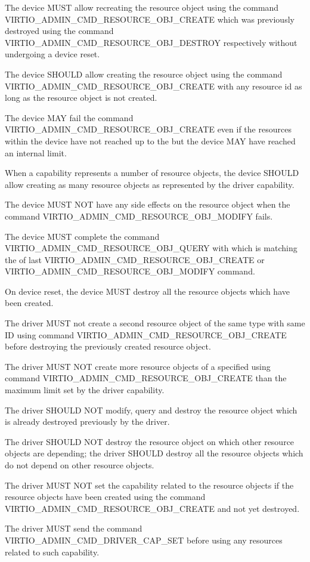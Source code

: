 The device MUST allow recreating the resource object using the command
VIRTIO_ADMIN_CMD_RESOURCE_OBJ_CREATE which was previously
destroyed using the command VIRTIO_ADMIN_CMD_RESOURCE_OBJ_DESTROY respectively
without undergoing a device reset.

The device SHOULD allow creating the resource object using
the command VIRTIO_ADMIN_CMD_RESOURCE_OBJ_CREATE with any resource
id as long as the resource object is not created.

The device MAY fail the command VIRTIO_ADMIN_CMD_RESOURCE_OBJ_CREATE even if the
resources within the device have not reached up to the 
but the device MAY have reached an internal limit.

When a capability represents a number of resource objects, the device SHOULD
allow creating as many resource objects as represented by the driver capability.

The device MUST NOT have any side effects on the resource object when the command
VIRTIO_ADMIN_CMD_RESOURCE_OBJ_MODIFY fails.

The device MUST complete the command VIRTIO_ADMIN_CMD_RESOURCE_OBJ_QUERY
with  which is matching the
 of last VIRTIO_ADMIN_CMD_RESOURCE_OBJ_CREATE
or VIRTIO_ADMIN_CMD_RESOURCE_OBJ_MODIFY command.

On device reset, the device MUST destroy all the resource objects which
have been created.


The driver MUST not create a second resource object of the same type with same
ID using command VIRTIO_ADMIN_CMD_RESOURCE_OBJ_CREATE before destroying the
previously created resource object.

The driver MUST NOT create more resource objects of a specified  using
command VIRTIO_ADMIN_CMD_RESOURCE_OBJ_CREATE than the maximum limit set by the
driver capability.

The driver SHOULD NOT modify, query and destroy the resource object which is
already destroyed previously by the driver.

The driver SHOULD NOT destroy the resource object on which other resource objects
are depending; the driver SHOULD destroy all the resource objects which do not depend
on other resource objects.

The driver MUST NOT set the capability related to the resource objects if the
resource objects have been created using the command VIRTIO_ADMIN_CMD_RESOURCE_OBJ_CREATE
and not yet destroyed.

The driver MUST send the command VIRTIO_ADMIN_CMD_DRIVER_CAP_SET before using
any resources related to such capability.
